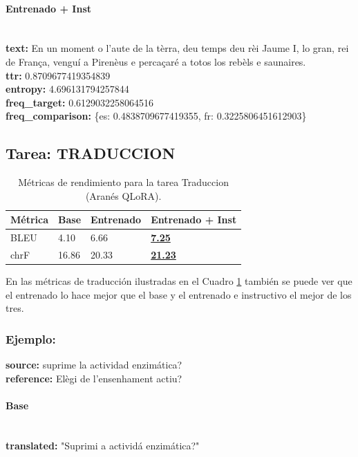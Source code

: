 \paragraph{Entrenado + Inst}~\\
\textbf{text:} En un moment o l’aute de la tèrra, deu temps deu rèi Jaume I, lo gran, rei de França, venguí a Pirenèus e percaçaré a totos los rebèls e saunaires.\\
\textbf{ttr:} 0.8709677419354839\\
\textbf{entropy:} 4.696131794257844\\
\textbf{freq\_target:} 0.6129032258064516\\
\textbf{freq\_comparison:} \{\textquotesingle{}es\textquotesingle{}: 0.4838709677419355, \textquotesingle{}fr\textquotesingle{}: 0.3225806451612903\}

\subsection{Tarea: TRADUCCION}\label{tarea-traduccion}
\begin{longtable}[]{@{}llll@{}}
\toprule\noalign{}
Métrica & Base & Entrenado & Entrenado + Inst \\
\midrule\noalign{}
\endhead
\bottomrule\noalign{}
\caption{Métricas de rendimiento para la tarea Traduccion (Aranés QLoRA).}
\label{tab:metricas_traduccion_Aranés QLoRA}
\endlastfoot
BLEU & 4.10 & 6.66 & \textbf{\underline{7.25}} \\
chrF & 16.86 & 20.33 & \textbf{\underline{21.23}} \\
\end{longtable}

En las métricas de traducción ilustradas en el Cuadro \ref{tab:metricas_traduccion_Aranés QLoRA} también se puede ver que el entrenado lo hace mejor que el base y el entrenado e instructivo el mejor de los tres.

\subsubsection{Ejemplo:}
\textbf{source:} suprime la actividad enzimática?\\
\textbf{reference:} Elègi de l’ensenhament actiu?

\paragraph{Base}~\\
\textbf{translated:} "Suprimi a actividá enzimática?"

